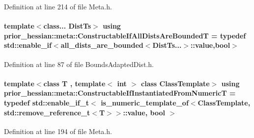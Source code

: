 Definition at line 214 of file Meta.\+h.

\paragraph[{\texorpdfstring{Constructable\+If\+All\+Dists\+Are\+BoundedT}{ConstructableIfAllDistsAreBoundedT}}]{\setlength{\rightskip}{0pt plus 5cm}template$<$class... Dist\+Ts$>$ using {\bf prior\+\_\+hessian\+::meta\+::\+Constructable\+If\+All\+Dists\+Are\+BoundedT} = typedef std\+::enable\+\_\+if$<${\bf all\+\_\+dists\+\_\+are\+\_\+bounded}$<$Dist\+Ts...$>$\+::value,bool$>$}\hypertarget{namespaceprior__hessian_1_1meta_a1f28a9142fc5442b2ba3cf722169578a}{}\label{namespaceprior__hessian_1_1meta_a1f28a9142fc5442b2ba3cf722169578a}


Definition at line 87 of file Bounds\+Adapted\+Dist.\+h.

\paragraph[{\texorpdfstring{Constructable\+If\+Instantiated\+From\+NumericT}{ConstructableIfInstantiatedFromNumericT}}]{\setlength{\rightskip}{0pt plus 5cm}template$<$class T , template$<$ int $>$ class Class\+Template$>$ using {\bf prior\+\_\+hessian\+::meta\+::\+Constructable\+If\+Instantiated\+From\+NumericT} = typedef std\+::enable\+\_\+if\+\_\+t$<$ {\bf is\+\_\+numeric\+\_\+template\+\_\+of}$<$Class\+Template, std\+::remove\+\_\+reference\+\_\+t$<$T$>$$>$\+::value, bool $>$}\hypertarget{namespaceprior__hessian_1_1meta_af9f0f80d3bced7421046f8eed53d21f1}{}\label{namespaceprior__hessian_1_1meta_af9f0f80d3bced7421046f8eed53d21f1}


Definition at line 194 of file Meta.\+h.


